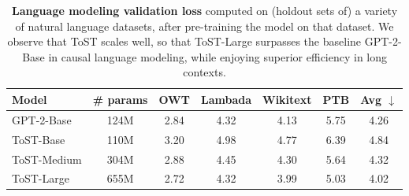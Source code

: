 \documentclass[../../book-main.tex]{subfiles}
\begin{document}
\begin{table}[!htbp]
\centering
\begin{tabular}{@{}lcccccc@{}}
\toprule
Model & \# params & OWT & Lambada & Wikitext & PTB & Avg $\downarrow$
\\ \midrule
GPT-2-Base & 124M & 2.84 & 4.32 & 4.13 & 5.75 & 4.26 \\
ToST-Base & 110M & 3.20 & 4.98 & 4.77 & 6.39 & 4.84 \\
ToST-Medium & 304M & 2.88 & 4.45 & 4.30 & 5.64 & 4.32 \\
ToST-Large & 655M & 2.72 & 4.32 & 3.99 & 5.03 & 4.02 \\ \bottomrule
\end{tabular}%
\caption{\small\textbf{Language modeling validation loss} computed on
(holdout sets of) a variety of natural language datasets, after
pre-training the model on that dataset. We observe that ToST scales
well, so that ToST-Large surpasses the baseline GPT-2-Base in causal
language modeling, while enjoying superior efficiency in long contexts.}
\label{tab:tost_lm}
\end{table}
\end{document}
